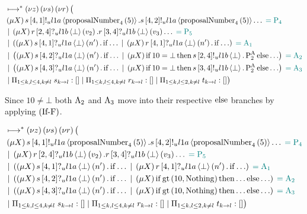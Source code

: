 \begin{align*}
&\mapstostar
\NuChannels \big (\\
&\Mu{\RecursionVariable} \SendUnreliableP{s}{4}{1}{\LOneA}{\proposalNumber{5}{4}}.\SendUnreliableP{s}{4}{2}{\LOneA}{\proposalNumber{5}{4}}\dots \comment{= \Proposer{4}}\\
&\Or \Mu{\RecursionVariable} \ReceiveUnreliableP{r}{2}{4}{\LOneB}{\bot}{v_2}.\ReceiveUnreliableP{r}{3}{4}{\LOneB}{\bot}{v_3}\dots \comment{= \Proposer{5}}\\
&\Or \Paren{
    \Mu{\RecursionVariable} \ReceiveUnreliableP{s}{4}{1}{\LOneA}{\bot}{n'}.\If{\dots}
    \Or \Mu{\RecursionVariable} \ReceiveUnreliableP{r}{4}{1}{\LOneA}{\bot}{n'}.\If{\dots}
} \comment{=\Acceptor{1}}\\
&\Or \Paren{
    \Mu{\RecursionVariable} \ReceiveUnreliableP{s}{4}{2}{\LOneA}{\bot}{n'}.\If{\dots}
    \Or \Mu{\RecursionVariable} \If{10 = \bot} \Then{\SendUnreliableP{s}{2}{4}{\LOneB}{\bot}.\PaTwo} \Else{\dots}
} \comment{=\Acceptor{2}}\\
&\Or \Paren{
    \Mu{\RecursionVariable} \ReceiveUnreliableP{s}{4}{3}{\LOneA}{\bot}{n'}.\If{\dots}
    \Or \Mu{\RecursionVariable} \If{10 = \bot} \Then{\SendUnreliableP{s}{3}{4}{\LOneB}{\bot}.\PaTwo} \Else{\dots}
} \comment{=\Acceptor{3}}\\
&\Or \InnerSessionQueues{s}
\Or \InnerSessionQueues{r}
\Or \OuterSessionQueues
\big )
\end{align*}

Since $10 \neq \bot$ both $\operatorname{A_{2}}$ and $\operatorname{A_{3}}$ move into their respective $\Else$ branches by applying $\left(\operatorname{If-F}\right)$.

\begin{align*}
&\mapstostar \NuChannels \big (\\
&\Mu{\RecursionVariable} \SendUnreliableP{s}{4}{1}{\LOneA}{\proposalNumber{5}{4}}.\SendUnreliableP{s}{4}{2}{\LOneA}{\proposalNumber{5}{4}}\dots \comment{= \Proposer{4}}\\
&\Or \Mu{\RecursionVariable} \ReceiveUnreliableP{r}{2}{4}{\LOneB}{\bot}{v_2}.\ReceiveUnreliableP{r}{3}{4}{\LOneB}{\bot}{v_3}\dots \comment{= \Proposer{5}}\\
&\Or \Paren{
    \Mu{\RecursionVariable} \ReceiveUnreliableP{s}{4}{1}{\LOneA}{\bot}{n'}.\If{\dots}
    \Or \Mu{\RecursionVariable} \ReceiveUnreliableP{r}{4}{1}{\LOneA}{\bot}{n'}.\If{\dots}
} \comment{=\Acceptor{1}}\\
&\Or \Paren{
    \Mu{\RecursionVariable} \ReceiveUnreliableP{s}{4}{2}{\LOneA}{\bot}{n'}.\If{\dots}
    \Or \Mu{\RecursionVariable} \If{\greaterThan{10}{\Nothing}} \Then{\dots} \Else{\dots}
} \comment{=\Acceptor{2}}\\
&\Or \Paren{
    \Mu{\RecursionVariable} \ReceiveUnreliableP{s}{4}{3}{\LOneA}{\bot}{n'}.\If{\dots}
    \Or \Mu{\RecursionVariable} \If{\greaterThan{10}{\Nothing}} \Then{\dots} \Else{\dots}
} \comment{=\Acceptor{3}}\\
&\Or \InnerSessionQueues{s}
\Or \InnerSessionQueues{r}
\Or \OuterSessionQueues
\big )
\end{align*}


